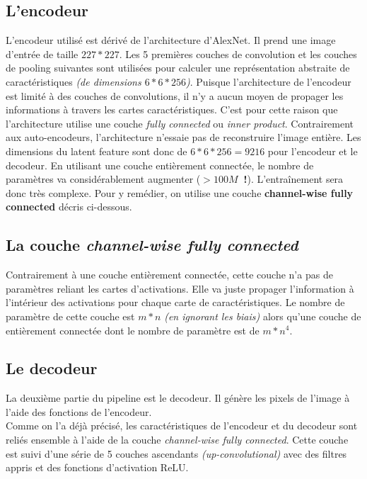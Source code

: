 \documentclass[11pt,a4paper]{article}
\begin{document}
        \subsection{L'encodeur}
            L’encodeur utilisé est dérivé de l’architecture d’AlexNet. Il prend une image d’entrée de taille $227*227$. Les 5 premières couches de convolution et les couches de pooling suivantes sont utilisées pour calculer une représentation abstraite de caractéristiques \emph{(de dimensions $6*6*256$)}. Puisque l’architecture de l’encodeur est limité à des couches de convolutions, il n’y a aucun moyen de propager les informations à travers les cartes caractéristiques. C’est pour cette raison que l’architecture utilise une couche \emph{fully connected} ou \emph{inner product}. Contrairement aux auto-encodeurs, l’architecture n’essaie pas de reconstruire l’image entière. Les dimensions du latent feature sont donc de $6*6*256=9216$ pour l’encodeur et le decodeur. En utilisant une couche entièrement connectée, le nombre de paramètres va considérablement augmenter (\textbf{$> 100M$ !}). L’entraînement sera donc très complexe.  Pour y remédier, on utilise une couche \textbf{channel-wise fully connected} décris ci-dessous. 
        
        \subsection{La couche \emph{channel-wise fully connected}}
            Contrairement à une couche entièrement connectée, cette couche n’a pas de paramètres reliant les cartes d’activations. Elle va juste propager l’information à l’intérieur des activations pour chaque carte de caractéristiques.  Le nombre de paramètre de cette couche est $m*n$ \emph{(en ignorant les biais)} alors qu'une couche de entièrement connectée dont le nombre de paramètre est de $m*n^4$.

        \subsection{Le decodeur}
            La deuxième partie du pipeline est le decodeur. Il génère les pixels de l’image à l’aide des fonctions de l’encodeur.\\
            Comme on l’a déjà précisé, les caractéristiques de l’encodeur et du decodeur sont reliés ensemble à l’aide de la couche \emph{channel-wise fully connected}. Cette couche est suivi d’une série de 5 couches ascendants \emph{(up-convolutional)} avec des filtres appris et des fonctions d’activation ReLU. 
            
\end{document}
